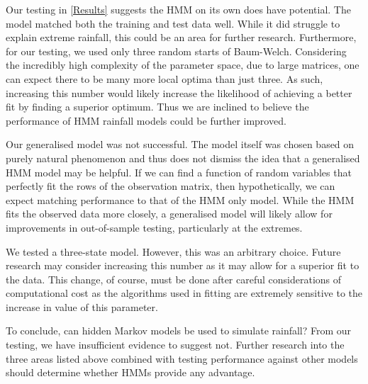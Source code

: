 Our testing in \ref{Results} suggests the HMM on its own does have potential. The model matched both the training and test data well. While it did struggle to explain extreme rainfall, this could be an area for further research. Furthermore, for our testing, we used only three random starts of Baum-Welch. Considering the incredibly high complexity of the parameter space, due to large matrices, one can expect there to be many more local optima than just three. As such, increasing this number would likely increase the likelihood of achieving a better fit by finding a superior optimum.  Thus we are inclined to believe the performance of HMM rainfall models could be further improved.

Our generalised model was not successful. The model itself was chosen based on purely natural phenomenon and thus does not dismiss the idea that a generalised HMM model may be helpful. If we can find a function of random variables that perfectly fit the rows of the observation matrix, then hypothetically, we can expect matching performance to that of the HMM only model.  While the HMM fits the observed data more closely, a generalised model will likely allow for improvements in out-of-sample testing, particularly at the extremes. 

We tested a three-state model. However, this was an arbitrary choice. Future research may consider increasing this number as it may allow for a superior fit to the data. This change, of course, must be done after careful considerations of computational cost as the algorithms used in fitting are extremely sensitive to the increase in value of this parameter.

To conclude, can hidden Markov models be used to simulate rainfall? From our testing, we have insufficient evidence to suggest not. Further research into the three areas listed above combined with testing performance against other models should determine whether HMMs provide any advantage.
